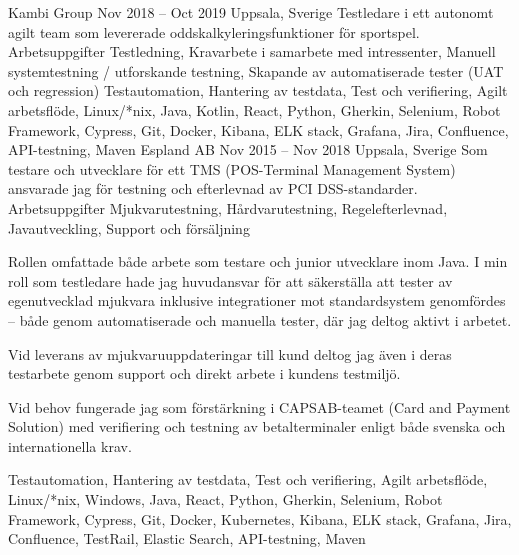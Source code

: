 \documentclass{sobCV}[2015/09/08]
\begin{document}
   {Kambi Group}
    {Nov 2018 -- Oct 2019}
   {Uppsala, Sverige}{
       Testledare i ett autonomt agilt team som levererade oddskalkyleringsfunktioner för sportspel.
   }
   {Arbetsuppgifter}{
       Testledning,
       Kravarbete i samarbete med intressenter,
       Manuell systemtestning / utforskande testning,
       Skapande av automatiserade tester (UAT och regression)
 }{
 }{
       Testautomation,
       Hantering av testdata,
       Test och verifiering,
       Agilt arbetsflöde, 
       Linux/*nix, 
       Java, 
       Kotlin, 
       React, 
       Python, 
       Gherkin, 
       Selenium, 
       Robot Framework,
       Cypress, 
       Git, 
       Docker, 
       Kibana, 
       ELK stack, 
       Grafana, 
       Jira, 
       Confluence, 
       API-testning, 
       Maven 
}
   {Espland AB}
    {Nov 2015 -- Nov 2018}
   {Uppsala, Sverige}{
       Som testare och utvecklare för ett TMS (POS-Terminal Management System) ansvarade jag för testning och efterlevnad av PCI DSS-standarder.
   }
   {Arbetsuppgifter}{
       Mjukvarutestning,
       Hårdvarutestning,
       Regelefterlevnad, 
       Javautveckling,
       Support och försäljning
 }{
      {
          Rollen omfattade både arbete som testare och junior utvecklare inom Java. I min roll som testledare hade jag huvudansvar för att säkerställa att tester av egenutvecklad mjukvara inklusive integrationer mot standardsystem genomfördes – både genom automatiserade och manuella tester, där jag deltog aktivt i arbetet.

          Vid leverans av mjukvaruuppdateringar till kund deltog jag även i deras testarbete genom support och direkt arbete i kundens testmiljö.

          Vid behov fungerade jag som förstärkning i CAPSAB-teamet (Card and Payment Solution) med verifiering och testning av betalterminaler enligt både svenska och internationella krav.
     }
 }{
       Testautomation,
       Hantering av testdata,
       Test och verifiering,
       Agilt arbetsflöde, 
       Linux/*nix, 
       Windows, 
       Java, 
       React, 
       Python, 
       Gherkin, 
       Selenium, 
       Robot Framework,
       Cypress, 
       Git, 
       Docker, 
       Kubernetes, 
       Kibana, 
       ELK stack, 
       Grafana, 
       Jira, 
       Confluence, 
       TestRail, 
       Elastic Search, 
       API-testning, 
       Maven 
}
\end{document}
